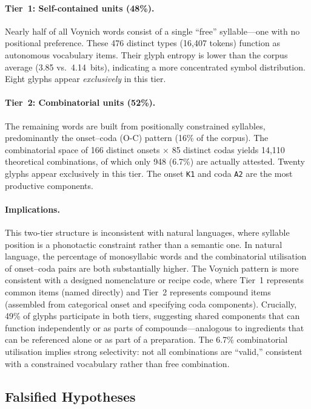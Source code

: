 \paragraph{Tier~1: Self-contained units (48\%).}
Nearly half of all Voynich words consist of a single ``free'' syllable---one with no positional preference.  These 476 distinct types (16,407 tokens) function as autonomous vocabulary items.  Their glyph entropy is lower than the corpus average (3.85 vs.\ 4.14~bits), indicating a more concentrated symbol distribution.  Eight glyphs appear \emph{exclusively} in this tier.

\paragraph{Tier~2: Combinatorial units (52\%).}
The remaining words are built from positionally constrained syllables, predominantly the onset--coda (O-C) pattern (16\% of the corpus).  The combinatorial space of 166 distinct onsets $\times$ 85 distinct codas yields 14,110 theoretical combinations, of which only 948 (6.7\%) are actually attested.  Twenty glyphs appear exclusively in this tier.  The onset \texttt{K1} and coda \texttt{A2} are the most productive components.

\paragraph{Implications.}
This two-tier structure is inconsistent with natural languages, where syllable position is a phonotactic constraint rather than a semantic one.  In natural language, the percentage of monosyllabic words and the combinatorial utilisation of onset--coda pairs are both substantially higher.  The Voynich pattern is more consistent with a designed nomenclature or recipe code, where Tier~1 represents common items (named directly) and Tier~2 represents compound items (assembled from categorical onset and specifying coda components).  Crucially, 49\% of glyphs participate in both tiers, suggesting shared components that can function independently or as parts of compounds---analogous to ingredients that can be referenced alone or as part of a preparation.  The 6.7\% combinatorial utilisation implies strong selectivity: not all combinations are ``valid,'' consistent with a constrained vocabulary rather than free combination.

\subsection{Falsified Hypotheses}

